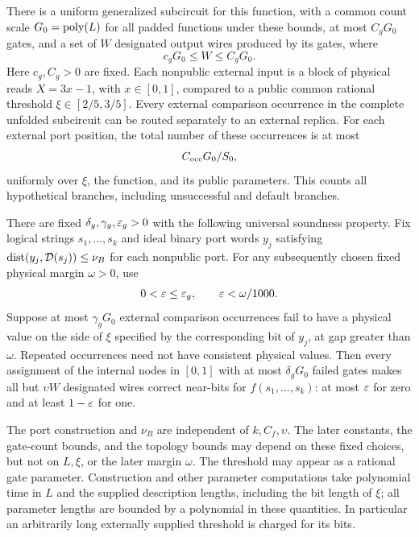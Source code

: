 \begin{theorem}
\begin{enumerate}[label=\textup{(\roman*)}]
There is a uniform generalized subcircuit for this function, with a
common count scale $G_0=\operatorname{poly}(L)$ for all padded functions under these
bounds, at most $C_gG_0$ gates, and a set of $W$ designated output wires
produced by its gates, where
\begin{equation}\label{out:designated-count}
 c_gG_0\leq W\leq C_gG_0.
\end{equation}
Here $c_g,C_g>0$ are fixed. Each nonpublic external input is a block of
physical reads $X=3x-1$, with $x\in[0,1]$, compared to a public common
rational threshold $\xi\in[2/5,3/5]$. Every external comparison occurrence
in the complete unfolded subcircuit can be routed separately to an
external replica.
For each external port position, the total number of these occurrences is
at most
\begin{equation}\label{out:port-occurrence}
 C_{\rm occ}G_0/S_0,
\end{equation}
uniformly over $\xi$, the function, and its public parameters. This counts
all hypothetical branches, including unsuccessful and default branches.

There are fixed $\delta_g,\gamma_g,\varepsilon_g>0$ with the following universal
soundness property. Fix logical strings $s_1,\ldots,s_k$ and ideal binary
port words $y_j$ satisfying
$\operatorname{dist}(y_j,\mathcal D(s_j))\leq\nu_B$ for each nonpublic port.
For any subsequently chosen fixed physical margin $\omega>0$, use
\[
 0<\varepsilon\leq\varepsilon_g,\qquad \varepsilon<\omega/1000.
\]
Suppose at most $\gamma_gG_0$ external comparison occurrences fail to
have a physical value on the side of $\xi$ specified by the corresponding
bit of $y_j$, at gap greater than $\omega$. Repeated occurrences need not
have consistent physical values. Then every assignment of the internal
nodes in $[0,1]$ with at most $\delta_gG_0$ failed gates makes all but
$\upsilon W$ designated wires correct near-bits for $f(s_1,\ldots,s_k)$:
at most $\varepsilon$ for zero and at least $1-\varepsilon$ for one.
\end{enumerate}
The port construction and $\nu_B$ are independent of $k,C_f,\upsilon$.
The later constants, the gate-count bounds, and the topology bounds may
depend on these fixed choices, but not on $L,\xi$, or the later margin
$\omega$. The threshold may appear as a rational gate parameter.
Construction and other parameter computations take polynomial time in
$L$ and the supplied description lengths, including the bit length of
$\xi$; all parameter lengths are bounded by a polynomial in these
quantities. In particular an arbitrarily long externally supplied
threshold is charged for its bits.
\end{theorem}

